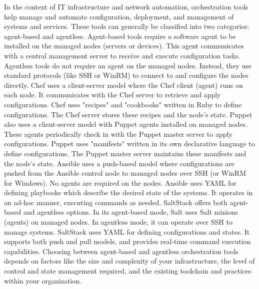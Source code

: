 \documentclass{article}
\begin{document}
	In the context of IT infrastructure and network automation, orchestration tools help manage and automate configuration, deployment, and management of systems and services. These tools can generally be classified into two categories: agent-based and agentless. Agent-based tools require a software agent to be installed on the managed nodes (servers or devices). This agent communicates with a central management server to receive and execute configuration tasks. Agentless tools do not require an agent on the managed nodes. Instead, they use standard protocols (like SSH or WinRM) to connect to and configure the nodes directly. Chef uses a client-server model where the Chef client (agent) runs on each node. It communicates with the Chef server to retrieve and apply configurations. Chef uses "recipes" and "cookbooks" written in Ruby to define configurations. The Chef server stores these recipes and the node’s state. Puppet also uses a client-server model with Puppet agents installed on managed nodes. These agents periodically check in with the Puppet master server to apply configurations. Puppet uses "manifests" written in its own declarative language to define configurations. The Puppet master server maintains these manifests and the node’s state. Ansible uses a push-based model where configurations are pushed from the Ansible control node to managed nodes over SSH (or WinRM for Windows). No agents are required on the nodes. Ansible uses YAML for defining playbooks which describe the desired state of the systems. It operates in an ad-hoc manner, executing commands as needed. SaltStack offers both agent-based and agentless options. In its agent-based mode, Salt uses Salt minions (agents) on managed nodes. In agentless mode, it can operate over SSH to manage systems. SaltStack uses YAML for defining configurations and states. It supports both push and pull models, and provides real-time command execution capabilities. Choosing between agent-based and agentless orchestration tools depends on factors like the size and complexity of your infrastructure, the level of control and state management required, and the existing toolchain and practices within your organization.
\end{document}
